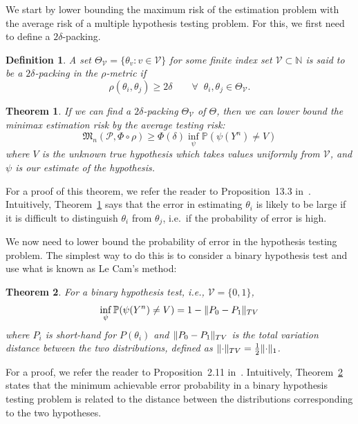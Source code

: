 \documentclass[conference]{IEEEtran}
\DeclarePairedDelimiter\norm{\lVert}{\rVert}
\newcommand{\Phiorho}{\Phi\!\circ\!\rho}
\newtheorem{theorem}{Theorem}
\newtheorem{definition}{Definition}
\begin{document}
We start by lower bounding the maximum risk of the estimation problem with the
average risk of a multiple hypothesis testing problem. For this, we first need
to define a $2\delta$-packing.%
\begin{definition}
	A set $\Theta_{\mathcal{V}} = \{ \theta_v : v \in \mathcal{V} \}$ for some
	finite index set $\mathcal{V} \subset \mathbb N$ is said to be a
	$2\delta$-packing in the $\rho$-metric if
	\begin{equation}
		\rho(\theta_i, \theta_j) \geq 2\delta \qquad \forall \;\; \theta_i, \theta_j \in \Theta_{\mathcal{V}}.
	\end{equation}
\end{definition}
\begin{theorem} \label{thm:est-to-testing}%
	If we can find a $2\delta$-packing $\Theta_{\mathcal{V}}$ of $\Theta$, then
	we can lower bound the minimax estimation risk by the average testing risk:
	\begin{equation}
		\mathfrak{M}_n(\mathcal{P}, \Phiorho) \geq \Phi(\delta) \inf_\psi \mathbb P (\psi(Y^n) \neq V)
	\end{equation}
	where $V$ is the unknown true hypothesis which takes values uniformly from
	$\mathcal{V}$, and $\psi$ is our estimate of the hypothesis.
\end{theorem}
For a proof of this theorem, we refer the reader to Proposition~13.3
in~\cite{Duchi2015Information}. Intuitively, Theorem~\ref{thm:est-to-testing}
says that the error in estimating $\theta_i$ is likely to be large if it is
difficult to distinguish $\theta_i$ from $\theta_j$, i.e.\ if the probability
of error is high.

We now need to lower bound the probability of error in the hypothesis testing
problem. The simplest way to do this is to consider a binary hypothesis test
and use what is known as Le Cam's method:
\begin{theorem} \label{thm:le-cam}
	For a binary hypothesis test, i.e., $\mathcal{V} = \{0, 1\}$,
	\begin{equation}
		\inf_\psi \mathbb P(\psi(Y^n) \neq V) = 1 - \norm{P_0 - P_1}_{TV}
	\end{equation}
	where $P_i$ is short-hand for $P(\theta_i)$ and $\norm{P_0 - P_1}_{TV}$ is
	the total variation distance between the two distributions, defined as
	$\norm{\cdot}_{TV} = \frac{1}{2} \norm{\cdot}_1$.
\end{theorem}
For a proof, we refer the reader to Proposition~2.11
in~\cite{Duchi2015Information}. Intuitively, Theorem~\ref{thm:le-cam} states
that the minimum achievable error probability in a binary hypothesis testing
problem is related to the distance between the distributions corresponding to
the two hypotheses.
\end{document}
